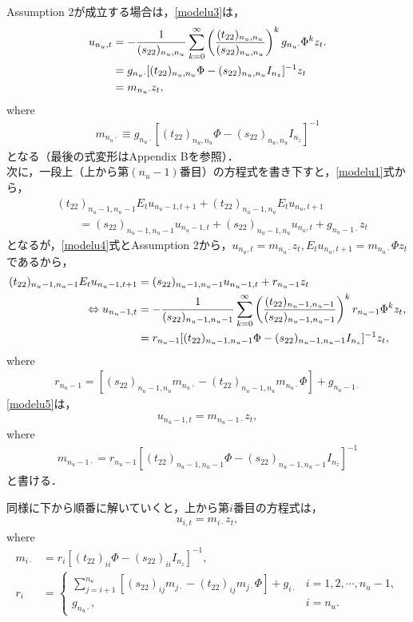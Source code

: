 \documentclass[a4j, dvipdfmx]{jarticle}
\begin{document}
Assumption 2が成立する場合は，\eqref{modelu3}は，
\begin{align}
u_{n_u,t} &= - \frac{1}{(s_{22})_{n_u,n_u}} \sum_{k = 0}^\infty \left(\frac{(t_{22})_{n_u,n_u}}{(s_{22})_{n_u,n_u}}\right)^k g_{n_u\cdot}\Phi^k z_t.\notag\\
&= g_{n_u\cdot}[(t_{22})_{n_u,n_u}\Phi - (s_{22})_{n_u,n_u}I_{n_z}]^{-1}z_t \notag\\
&= m_{n_u\cdot}z_t, \label{modelu4}
\end{align}
where
\begin{align}
m_{n_u\cdot} \equiv g_{n_u\cdot}[(t_{22})_{n_u,n_u}\Phi - (s_{22})_{n_u,n_u}I_{n_z}]^{-1}
\end{align}
となる（最後の式変形はAppendix Bを参照）．\\

次に，一段上（上から第$(n_u-1)$番目）の方程式を書き下すと，\eqref{modelu1}式から，
\begin{align*}
&(t_{22})_{n_u-1,n_u-1}E_tu_{n_u-1,t+1} + (t_{22})_{n_u-1,n_u}E_tu_{n_u,t+1} \\
&\qquad = (s_{22})_{n_u-1,n_u-1}u_{n_u-1,t} + (s_{22})_{n_u-1,n_u}u_{n_u,t} + g_{n_u-1\cdot}z_t 
\end{align*}
となるが，\eqref{modelu4}式とAssumption 2から，$u_{n_u,t} = m_{n_u\cdot} z_t, E_tu_{n_u,t+1} = m_{n_u\cdot}\Phi z_t$であるから，
\begin{align}
(t_{22})_{n_u-1,n_u-1}E_tu_{n_u-1,t+1} &= (s_{22})_{n_u-1,n_u-1}u_{n_u-1,t} + r_{n_u-1} z_t\notag\\
\Leftrightarrow u_{n_u-1,t} &= -\frac{1}{(s_{22})_{n_u-1,n_u-1}}\sum_{k=0}^\infty \left(\frac{(t_{22})_{n_u-1,n_u-1}}{(s_{22})_{n_u-1,n_u-1}}\right)^k r_{n_u-1}\Phi^k z_t, \\
&= r_{n_u-1}[(t_{22})_{n_u-1,n_u-1}\Phi - (s_{22})_{n_u-1,n_u-1}I_{n_z}]^{-1}z_t,\label{modelu5}
\end{align}
where
\begin{align*}
r_{n_u-1} = [(s_{22})_{n_u-1,n_u}m_{n_u\cdot} - (t_{22})_{n_u-1,n_u} m_{n_u\cdot}\Phi] + g_{n_u-1\cdot}
\end{align*}
\eqref{modelu5}は，
\begin{align*}
u_{n_u-1,t} = m_{n_u-1\cdot}z_t,
\end{align*}
where
\begin{align*}
m_{n_u-1\cdot} = r_{n_u-1}[(t_{22})_{n_u-1,n_u-1}\Phi - (s_{22})_{n_u-1,n_u-1}I_{n_z}]^{-1}
\end{align*}
と書ける．

同様に下から順番に解いていくと，上から第$i$番目の方程式は，
\begin{align}
u_{i,t} = m_{i\cdot}z_t,
\end{align}
where
\begin{align}
m_{i\cdot} &= r_i[(t_{22})_{ii}\Phi - (s_{22})_{ii}I_{n_z}]^{-1},\label{mi}\\
r_i &= \begin{cases}\sum_{j = i+1}^{n_u}[(s_{22})_{ij}m_{j\cdot} - (t_{22})_{ij} m_{j\cdot}\Phi] + g_{i\cdot} &i = 1,2,\cdots,n_u-1,\\
g_{n_u\cdot}, &i = n_u.\end{cases}\label{ri}
\end{align}
\end{document}
